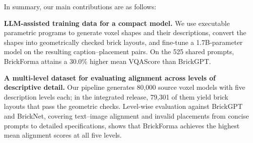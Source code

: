 In summary, our main contributions are as follows:

\textbf{LLM-assisted training data for a compact model.}
We use executable parametric programs to generate voxel shapes and their descriptions, convert the shapes into geometrically checked brick layouts, and fine-tune a 1.7B-parameter model on the resulting caption--placement pairs. On the 525 shared prompts, BrickForma attains a 30.0\% higher mean VQAScore than BrickGPT.

\textbf{A multi-level dataset for evaluating alignment across levels of descriptive detail.}
Our pipeline generates 80,000 source voxel models with five description levels each; in the integrated release, 79,301 of them yield brick layouts that pass the geometric checks. Level-wise evaluation against BrickGPT and BrickNet, covering text--image alignment and invalid placements from concise prompts to detailed specifications, shows that BrickForma achieves the highest mean alignment scores at all five levels.
